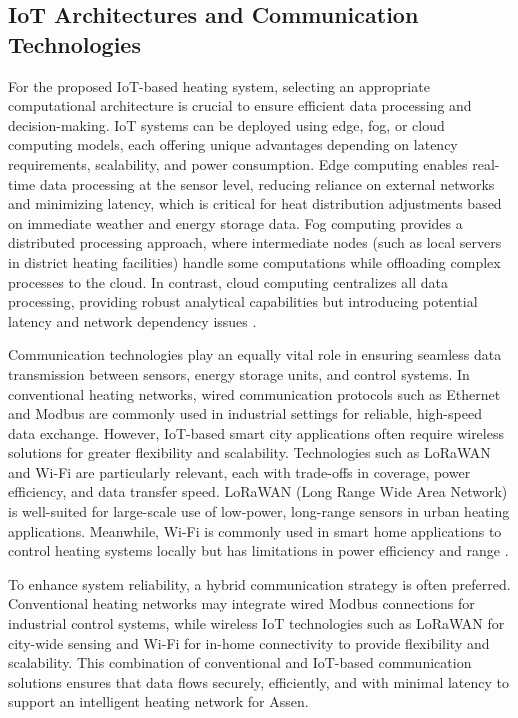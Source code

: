 \documentclass{article}
\begin{document}
\subsection{IoT Architectures and Communication Technologies}

For the proposed IoT-based heating system, selecting an appropriate computational architecture is crucial to ensure efficient data processing and decision-making. IoT systems can be deployed using edge, fog, or cloud computing models, each offering unique advantages depending on latency requirements, scalability, and power consumption. Edge computing enables real-time data processing at the sensor level, reducing reliance on external networks and minimizing latency, which is critical for heat distribution adjustments based on immediate weather and energy storage data. Fog computing provides a distributed processing approach, where intermediate nodes (such as local servers in district heating facilities) handle some computations while offloading complex processes to the cloud. In contrast, cloud computing centralizes all data processing, providing robust analytical capabilities but introducing potential latency and network dependency issues \cite{iot_architecture}. 

Communication technologies play an equally vital role in ensuring seamless data transmission between sensors, energy storage units, and control systems. In conventional heating networks, wired communication protocols such as Ethernet and Modbus are commonly used in industrial settings for reliable, high-speed data exchange. However, IoT-based smart city applications often require wireless solutions for greater flexibility and scalability. Technologies such as LoRaWAN and Wi-Fi are particularly relevant, each with trade-offs in coverage, power efficiency, and data transfer speed. LoRaWAN (Long Range Wide Area Network) is well-suited for large-scale use of low-power, long-range sensors in urban heating applications. Meanwhile, Wi-Fi is commonly used in smart home applications to control heating systems locally but has limitations in power efficiency and range \cite{comm_tech_review}. 

To enhance system reliability, a hybrid communication strategy is often preferred. Conventional heating networks may integrate wired Modbus connections for industrial control systems, while wireless IoT technologies such as LoRaWAN for city-wide sensing and Wi-Fi for in-home connectivity to provide flexibility and scalability. This combination of conventional and IoT-based communication solutions ensures that data flows securely, efficiently, and with minimal latency to support an intelligent heating network for Assen.
\end{document}
